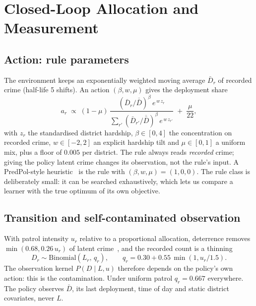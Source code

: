 \section{Closed-Loop Allocation and Measurement}

\subsection{Action: rule parameters}
The environment keeps an exponentially weighted moving average $\bar D_r$ of
recorded crime (half-life 5 shifts). An action $(\beta, w, \mu)$ gives the
deployment share
\begin{equation}
a_r \;\propto\; (1-\mu)\,
\frac{(\bar D_r/\overline{\bar D})^{\beta}\, e^{\,w\, z_r}}
{\sum_{r'} (\bar D_{r'}/\overline{\bar D})^{\beta}\, e^{\,w\, z_{r'}}}
\;+\; \frac{\mu}{22},
\label{eq:rule}
\end{equation}
with $z_r$ the standardised district hardship, $\beta\in[0,4]$ the concentration
on recorded crime, $w\in[-2,2]$ an explicit hardship tilt and $\mu\in[0,1]$ a
uniform mix, plus a floor of $0.005$ per district. The rule always reads
\emph{recorded} crime; giving the policy latent crime changes its observation,
not the rule's input. A PredPol-style heuristic~\cite{ensign2018} is the rule
with $(\beta, w, \mu) = (1, 0, 0)$. The rule class is deliberately small: it can
be searched exhaustively, which lets us compare a learner with the true optimum
of its own objective.

\subsection{Transition and self-contaminated observation}
With patrol intensity $u_r$ relative to a proportional allocation, deterrence
removes $\min(0.68, 0.26\,u_r)$ of latent crime~\cite{weisburd2017}, and the
recorded count is a thinning
\begin{equation}
D_r \sim \mathrm{Binomial}(L_r,\, q_r), \qquad
q_r = 0.30 + 0.55\,\min(1, u_r/1.5).
\label{eq:detect}
\end{equation}
The observation kernel $P(D \mid L, u)$ therefore depends on the policy's own
action: this is the contamination. Under uniform patrol $q_r = 0.667$ everywhere.
The policy observes $\bar D$, its last deployment, time of day and static district
covariates, never $L$.

